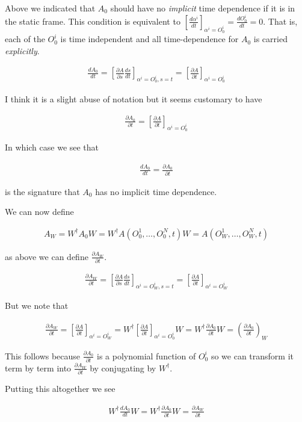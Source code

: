 \documentclass[12pt]{article}
\newcommand{\ddt}[1]{\frac{d #1}{dt}}
\newcommand{\ppt}[1]{\frac{\partial #1}{\partial t}}
\begin{document}
Above we indicated that $A_0$ should have no \textit{implicit} time dependence if it is in the static frame. This condition is equivalent to $\left[\ddt{\alpha^i}\right]_{\alpha^i=O^i_0} = \ddt{O^i_0}= 0$. That is, each of the $O^i_0$ is time independent and all time-dependence for $A_0$ is carried \textit{explicitly}.

\begin{align}
\ddt{A_0} = \left[\frac{\partial A}{\partial s} \ddt{s} \right]_{\alpha^i=O_0^i,s=t} = \left[\ppt{A}\right]_{\alpha^i=O_0^i}
\end{align}

I think it is a slight abuse of notation but it seems customary to have

\begin{align}
\ppt{A_0} = \left[\ppt{A} \right]_{\alpha^i=O^i_0}
\end{align}

In which case we see that

\begin{align}
\ddt{A_0} = \ppt{A_0}
\end{align}

is the signature that $A_0$ has no implicit time dependence.

We can now define 

\begin{align}
A_W = W^{\dag} A_0 W = W^{\dag} A(O_0^1,\ldots,O_0^N,t) W = A(O_W^1,\ldots, O_W^N,t)
\end{align}

as above we can define $\ppt{A_W}$.

\begin{align}
\ppt{A_W} = \left[\frac{\partial A}{\partial s} \ddt{s}\right]_{\alpha^i=O_W^i,s=t} = \left[\ppt{A} \right]_{\alpha^i = O_W^i}
\end{align}

But we note that

\begin{align}
\ppt{A_W} = \left[\ppt{A} \right]_{\alpha^i=O_W^i} = W^{\dag} \left[\ppt{A} \right]_{\alpha^i = O_0^i} W = W^{\dag} \ppt{A_0} W = \left(\ppt{A_0}\right)_W
\end{align}

This follows because $\ppt{A_0}$ is a polynomial function of $O_0^i$ so we can transform it term by term into $\ppt{A_W}$ by conjugating by $W^{\dag}$.

Putting this altogether we see

\begin{align}
W^{\dag}\ddt{A_0}W = W^{\dag}\ppt{A_0}W = \ppt{A_W}
\end{align}
\end{document}
